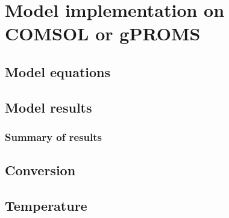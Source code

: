 \section{Model implementation on COMSOL or gPROMS}
\subsection{Model equations}
\subsection{Model results}
\subsubsection{Summary of results}
\subsection{Conversion}
\subsection{Temperature}